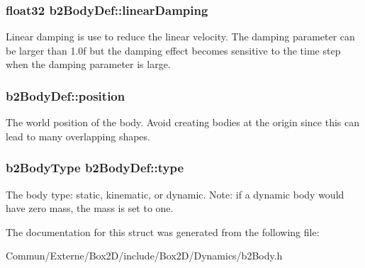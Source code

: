 \subsubsection[{\texorpdfstring{linear\+Damping}{linearDamping}}]{\setlength{\rightskip}{0pt plus 5cm}float32 b2\+Body\+Def\+::linear\+Damping}\hypertarget{structb2_body_def_a728f6df3be7dedb331455105e3659d46}{}\label{structb2_body_def_a728f6df3be7dedb331455105e3659d46}
Linear damping is use to reduce the linear velocity. The damping parameter can be larger than 1.\+0f but the damping effect becomes sensitive to the time step when the damping parameter is large. 
\subsubsection[{\texorpdfstring{position}{position}}]{ b2\+Body\+Def\+::position}\hypertarget{structb2_body_def_a680cadc09ad6cf4b3366cbf0914c648b}{}\label{structb2_body_def_a680cadc09ad6cf4b3366cbf0914c648b}
The world position of the body. Avoid creating bodies at the origin since this can lead to many overlapping shapes. 
\subsubsection[{\texorpdfstring{type}{type}}]{\setlength{\rightskip}{0pt plus 5cm}b2\+Body\+Type b2\+Body\+Def\+::type}\hypertarget{structb2_body_def_a89cc3ad1873908042b002147b3861381}{}\label{structb2_body_def_a89cc3ad1873908042b002147b3861381}
The body type\+: static, kinematic, or dynamic. Note\+: if a dynamic body would have zero mass, the mass is set to one. 

The documentation for this struct was generated from the following file\+:\begin{DoxyCompactItemize}
\item 
Commun/\+Externe/\+Box2\+D/include/\+Box2\+D/\+Dynamics/b2\+Body.\+h\end{DoxyCompactItemize}
